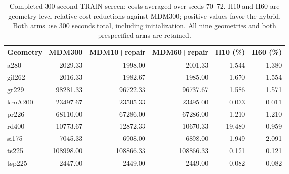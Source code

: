 \begin{table}[tbp]
\centering
\small
\begin{tabular}{lrrrrr}
\toprule
Geometry & MDM300 & MDM10+repair & MDM60+repair & H10 (\%) & H60 (\%) \\
\midrule
a280 & 2029.33 & 1998.00 & 2001.33 & 1.544 & 1.380 \\
gil262 & 2016.33 & 1982.67 & 1985.00 & 1.670 & 1.554 \\
gr229 & 98281.33 & 96722.33 & 96737.67 & 1.586 & 1.571 \\
kroA200 & 23497.67 & 23505.33 & 23495.00 & -0.033 & 0.011 \\
pr226 & 68110.00 & 67286.00 & 67286.00 & 1.210 & 1.210 \\
rd400 & 10773.67 & 12872.33 & 10670.33 & -19.480 & 0.959 \\
si175 & 7045.33 & 6908.00 & 6898.00 & 1.949 & 2.091 \\
ts225 & 108998.00 & 108866.33 & 108866.33 & 0.121 & 0.121 \\
tsp225 & 2447.00 & 2449.00 & 2449.00 & -0.082 & -0.082 \\
\bottomrule
\end{tabular}
\caption{Completed 300-second TRAIN screen: costs averaged over seeds 70--72. H10 and H60 are geometry-level relative cost reductions against MDM300; positive values favor the hybrid. Both arms use 300 seconds total, including initialization. All nine geometries and both prespecified arms are retained.}
\label{tab:awake300}
\end{table}
